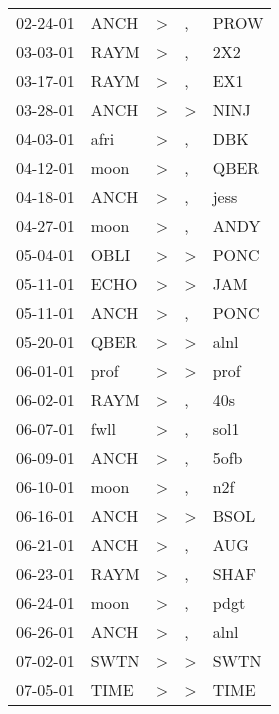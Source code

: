 \begin{supertabular}{lllll}
 02-24-01 &   ANCH &     \textgreater &                , &   PROW \\
 03-03-01 &   RAYM &     \textgreater &                , &    2X2 \\
 03-17-01 &   RAYM &     \textgreater &                , &    EX1 \\
 03-28-01 &   ANCH &     \textgreater &     \textgreater &   NINJ \\
 04-03-01 &   afri &     \textgreater &                , &    DBK \\
 04-12-01 &   moon &     \textgreater &                , &   QBER \\
 04-18-01 &   ANCH &     \textgreater &                , &   jess \\
 04-27-01 &   moon &     \textgreater &                , &   ANDY \\
 05-04-01 &   OBLI &     \textgreater &     \textgreater &   PONC \\
 05-11-01 &   ECHO &     \textgreater &     \textgreater &    JAM \\
 05-11-01 &   ANCH &     \textgreater &                , &   PONC \\
 05-20-01 &   QBER &     \textgreater &     \textgreater &   alnl \\
 06-01-01 &   prof &     \textgreater &     \textgreater &   prof \\
 06-02-01 &   RAYM &     \textgreater &                , &    40s \\
 06-07-01 &   fwll &     \textgreater &                , &   sol1 \\
 06-09-01 &   ANCH &     \textgreater &                , &   5ofb \\
 06-10-01 &   moon &     \textgreater &                , &    n2f \\
 06-16-01 &   ANCH &     \textgreater &     \textgreater &   BSOL \\
 06-21-01 &   ANCH &     \textgreater &                , &    AUG \\
 06-23-01 &   RAYM &     \textgreater &                , &   SHAF \\
 06-24-01 &   moon &     \textgreater &                , &   pdgt \\
 06-26-01 &   ANCH &     \textgreater &                , &   alnl \\
 07-02-01 &   SWTN &     \textgreater &     \textgreater &   SWTN \\
 07-05-01 &   TIME &     \textgreater &     \textgreater &   TIME \\

\end{supertabular}
